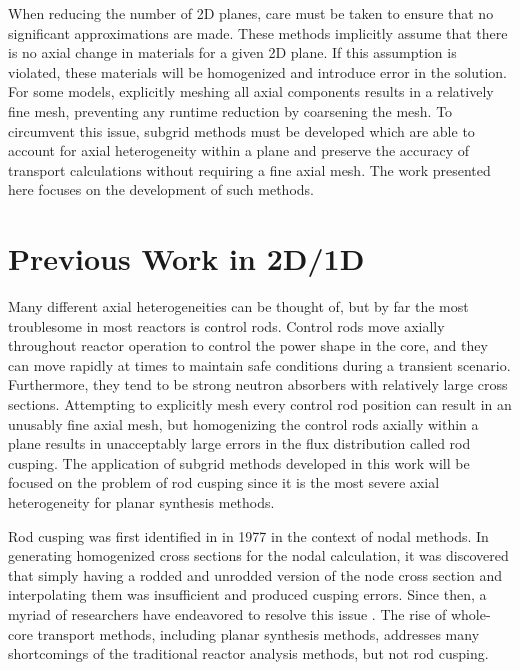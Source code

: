 When reducing the number of 2D planes, care must be taken to ensure that no significant approximations are made.  These methods implicitly assume that there is no axial change in materials for a given 2D plane.  If this assumption is violated, these materials will be homogenized and introduce error in the solution.  For some models, explicitly meshing all axial components results in a relatively fine mesh, preventing any runtime reduction by coarsening the mesh.  To circumvent this issue, subgrid methods must be developed which are able to account for axial heterogeneity within a plane and preserve the accuracy of transport calculations without requiring a fine axial mesh.  The work presented here focuses on the development of such methods.

\section{Previous Work in 2D/1D}

Many different axial heterogeneities can be thought of, but by far the most troublesome in most reactors is control rods.  Control rods move axially throughout reactor operation to control the power shape in the core, and they can move rapidly at times to maintain safe conditions during a transient scenario.  Furthermore, they tend to be strong neutron absorbers with relatively large cross sections.  Attempting to explicitly mesh every control rod position can result in an unusably fine axial mesh, but homogenizing the control rods axially within a plane results in unacceptably large errors in the flux distribution called rod cusping.  The application of subgrid methods developed in this work will be focused on the problem of rod cusping since it is the most severe axial heterogeneity for planar synthesis methods.

Rod cusping was first identified in \cite{finnemann1977RodCuspingOrigMention} in 1977 in the context of nodal methods.  In generating homogenized cross sections for the nodal calculation, it was discovered that simply having a rodded and unrodded version of the node cross section and interpolating them was insufficient and produced cusping errors.  Since then, a myriad of researchers have endeavored to resolve this issue \cite{hoxieThesis1982application,khalilThesis1983application,chengThesis1981homogenizationResponseMatrix,finckThesis1982homogenizationResponseMatrix,bennewitz1975higher,finnemann1981space,langenbuch1977coarse,HanSemJooThesis1984,gehinThesis1992quasi,smith1992enhancementsStudxvickCoreManagementSystem,lee1998CuspingCorrection1DFineMeshFluxProfiles,downar2004PARCStheory,kim1990BilinearWeighting,de2012NEMmodification,martinez1999NEMmodOrig,dall2002nodeEquivalenceDecusping,yamamoto2004pinByPinNodalDecusping,yu2015CIAMArodDecusping,lu2015CIAMAintro,cho2015CRX2d1dFusionDecusping,ICAPPcontrolRodDecuspingNTRACER,Ryu2017nTRACERWholeCoreTransportSolutionstoC5G7-TDBenchmark}.  The rise of whole-core transport methods, including planar synthesis methods, addresses many shortcomings of the traditional reactor analysis methods, but not rod cusping.


